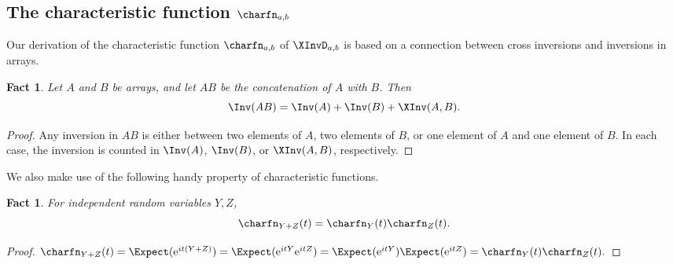 \documentclass[11pt]{article}
\numberwithin{equation}{section}
\newtheorem{fact}[theorem]{Fact}
\theoremstyle{definition}
\theoremstyle{plain}
\newcommand{\eee}{\mathrm e}
\begin{document}
\subsection{The characteristic function \texorpdfstring{$\charfn_{a,b}$}{phi a,b}}
\label{sec:characteristic}

Our derivation of the characteristic function $\charfn_{a,b}$ of $\XInvD_{a,b}$ is based on a connection between cross inversions and inversions in arrays.
\begin{fact}
    \label{fact:cross-inversion-property}
    Let $A$ and $B$ be arrays, and let $AB$ be the concatenation of $A$ with $B$. Then
    \[\Inv(AB)=\Inv(A)+\Inv(B)+\XInv(A,B). \]
\end{fact}
\begin{proof}
    Any inversion in $AB$ is either between two elements of $A$, two elements of $B$, or one element of $A$ and one element of $B$. In each case, the inversion is counted in $\Inv(A)$, $\Inv(B)$, or $\XInv(A,B)$, respectively.
\end{proof}

We also make use of the following handy property of characteristic functions.
\begin{fact}
    \label{fact:charfn-mult}
    For independent random variables $Y,Z$,
    \[\charfn_{Y+Z}(t)=\charfn_Y(t)\charfn_Z(t). \]
\end{fact}
\begin{proof}
%
\quad
$ \charfn_{Y+Z}(t)=\Expect(\eee^{it(Y+Z)})=\Expect(\eee^{itY}\eee^{itZ})=\Expect(\eee^{itY})\Expect(\eee^{itZ})=\charfn_Y(t)\charfn_Z(t). $   %
\end{proof}
%
\end{document}
